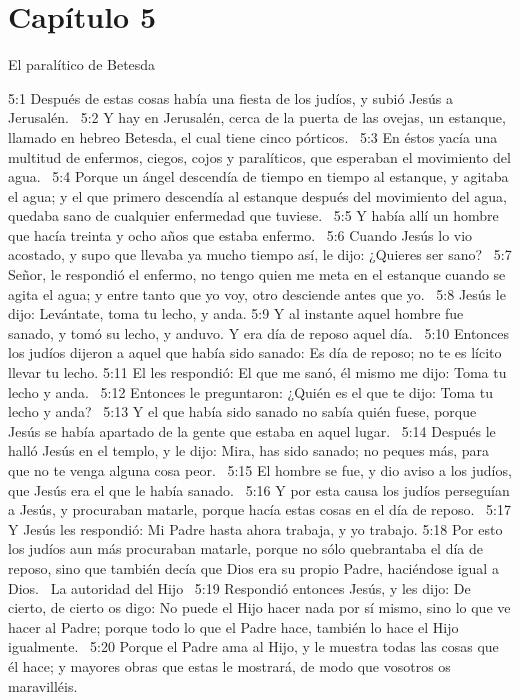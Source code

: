 \section*{Capítulo 5}
El paralítico de Betesda  

5:1 Después de estas cosas había una fiesta de los judíos, y subió Jesús a Jerusalén.  
5:2 Y hay en Jerusalén, cerca de la puerta de las ovejas, un estanque, llamado en hebreo Betesda, el cual tiene cinco pórticos.  
5:3 En éstos yacía una multitud de enfermos, ciegos, cojos y paralíticos, que esperaban el movimiento del agua.  
5:4 Porque un ángel descendía de tiempo en tiempo al estanque, y agitaba el agua; y el que primero descendía al estanque después del movimiento del agua, quedaba sano de cualquier enfermedad que tuviese.  
5:5 Y había allí un hombre que hacía treinta y ocho años que estaba enfermo.  
5:6 Cuando Jesús lo vio acostado, y supo que llevaba ya mucho tiempo así, le dijo: ¿Quieres ser sano?  
5:7 Señor, le respondió el enfermo, no tengo quien me meta en el estanque cuando se agita el agua; y entre tanto que yo voy, otro desciende antes que yo.  
5:8 Jesús le dijo: Levántate, toma tu lecho, y anda. 
5:9 Y al instante aquel hombre fue sanado, y tomó su lecho, y anduvo. Y era día de reposo aquel día.  
5:10 Entonces los judíos dijeron a aquel que había sido sanado: Es día de reposo; no te es lícito llevar tu lecho. 
5:11 El les respondió: El que me sanó, él mismo me dijo: Toma tu lecho y anda.  
5:12 Entonces le preguntaron: ¿Quién es el que te dijo: Toma tu lecho y anda?  
5:13 Y el que había sido sanado no sabía quién fuese, porque Jesús se había apartado de la gente que estaba en aquel lugar.  
5:14 Después le halló Jesús en el templo, y le dijo: Mira, has sido sanado; no peques más, para que no te venga alguna cosa peor.  
5:15 El hombre se fue, y dio aviso a los judíos, que Jesús era el que le había sanado.  
5:16 Y por esta causa los judíos perseguían a Jesús, y procuraban matarle, porque hacía estas cosas en el día de reposo.  
5:17 Y Jesús les respondió: Mi Padre hasta ahora trabaja, y yo trabajo. 
5:18 Por esto los judíos aun más procuraban matarle, porque no sólo quebrantaba el día de reposo, sino que también decía que Dios era su propio Padre, haciéndose igual a Dios.  
La autoridad del Hijo  
5:19 Respondió entonces Jesús, y les dijo: De cierto, de cierto os digo: No puede el Hijo hacer nada por sí mismo, sino lo que ve hacer al Padre; porque todo lo que el Padre hace, también lo hace el Hijo igualmente.  
5:20 Porque el Padre ama al Hijo, y le muestra todas las cosas que él hace; y mayores obras que estas le mostrará, de modo que vosotros os maravilléis.  
